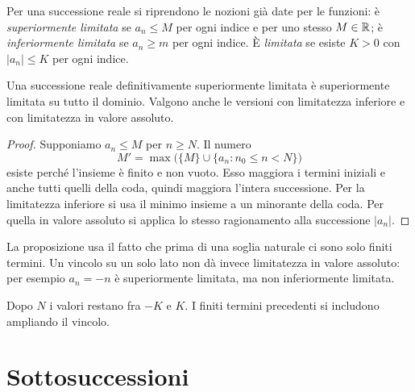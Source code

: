 Per una successione reale si riprendono le nozioni già date per le funzioni: è \emph{superiormente limitata} se $a_n\le M$ per ogni indice e per uno stesso $M\in\mathbb{R}$; è \emph{inferiormente limitata} se $a_n\ge m$ per ogni indice. È \emph{limitata} se esiste $K>0$ con $|a_n|\le K$ per ogni indice.

\begin{proposizione}
\label{prop:coda-limitata}
Una successione reale definitivamente superiormente limitata è superiormente limitata su tutto il dominio. Valgono anche le versioni con limitatezza inferiore e con limitatezza in valore assoluto.
\end{proposizione}
\begin{proof}
Supponiamo $a_n\le M$ per $n\ge N$. Il numero
\[
M'=\max\bigl(\{M\}\cup\{a_n:n_0\le n<N\}\bigr)
\]
esiste perché l'insieme è finito e non vuoto. Esso maggiora i termini iniziali e anche tutti quelli della coda, quindi maggiora l'intera successione. Per la limitatezza inferiore si usa il minimo insieme a un minorante della coda. Per quella in valore assoluto si applica lo stesso ragionamento alla successione $|a_n|$.
\end{proof}

La proposizione usa il fatto che prima di una soglia naturale ci sono solo finiti termini. Un vincolo su un solo lato non dà invece limitatezza in valore assoluto: per esempio $a_n=-n$ è superiormente limitata, ma non inferiormente limitata.

\begin{schema}
\par\smallskip Dopo $N$ i valori restano fra $-K$ e $K$. I finiti termini precedenti si includono ampliando il vincolo.
\end{schema}

\section{Sottosuccessioni}

